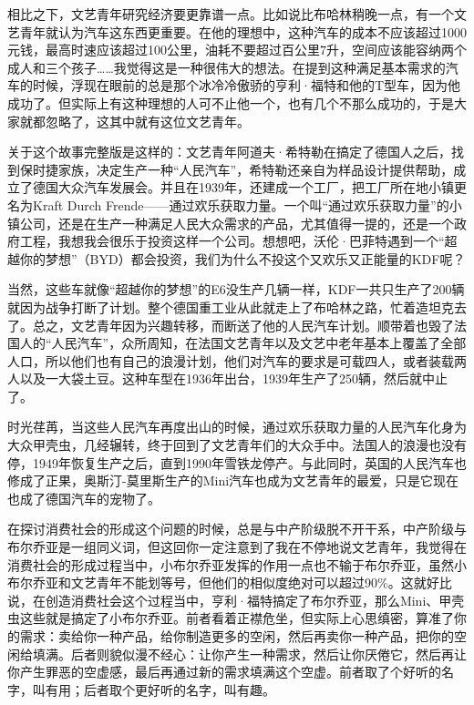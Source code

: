 相比之下，文艺青年研究经济要更靠谱一点。比如说比布哈林稍晚一点，有一个文艺青年就认为汽车这东西更重要。在他的理想中，这种汽车的成本不应该超过1000元钱，最高时速应该超过100公里，油耗不要超过百公里7升，空间应该能容纳两个成人和三个孩子\ldots{}\ldots{}我觉得这是一种很伟大的想法。在提到这种满足基本需求的汽车的时候，浮现在眼前的总是那个冰冷冷傲骄的亨利·福特和他的T型车，因为他成功了。但实际上有这种理想的人可不止他一个，也有几个不那么成功的，于是大家就都忽略了，这其中就有这位文艺青年。

关于这个故事完整版是这样的：文艺青年阿道夫·希特勒在搞定了德国人之后，找到保时捷家族，决定生产一种``人民汽车''，希特勒还亲自为样品设计提供帮助，成立了德国大众汽车发展会。并且在1939年，还建成一个工厂，把工厂所在地小镇更名为Kraft
Durch
Frende------通过欢乐获取力量。一个叫``通过欢乐获取力量''的小镇公司，还是在生产一种满足人民大众需求的产品，尤其值得一提的，还是一个政府工程，我想我会很乐于投资这样一个公司。想想吧，沃伦·巴菲特遇到一个``超越你的梦想''（BYD）都会投资，我们为什么不投这个又欢乐又正能量的KDF呢？

当然，这些车就像``超越你的梦想''的E6没生产几辆一样，KDF一共只生产了200辆就因为战争打断了计划。整个德国重工业从此就走上了布哈林之路，忙着造坦克去了。总之，文艺青年因为兴趣转移，而断送了他的人民汽车计划。顺带着也毁了法国人的``人民汽车''，众所周知，在法国文艺青年以及文艺中老年基本上覆盖了全部人口，所以他们也有自己的浪漫计划，他们对汽车的要求是可载四人，或者装载两人以及一大袋土豆。这种车型在1936年出台，1939年生产了250辆，然后就中止了。

时光荏苒，当这些人民汽车再度出山的时候，通过欢乐获取力量的人民汽车化身为大众甲壳虫，几经辗转，终于回到了文艺青年们的大众手中。法国人的浪漫也没有停，1949年恢复生产之后，直到1990年雪铁龙停产。与此同时，英国的人民汽车也修成了正果，奥斯汀-莫里斯生产的Mini汽车也成为文艺青年的最爱，只是它现在也成了德国汽车的宠物了。

在探讨消费社会的形成这个问题的时候，总是与中产阶级脱不开干系，中产阶级与布尔乔亚是一组同义词，但这回你一定注意到了我在不停地说文艺青年，我觉得在消费社会的形成过程当中，小布尔乔亚发挥的作用一点也不输于布尔乔亚，虽然小布尔乔亚和文艺青年不能划等号，但他们的相似度绝对可以超过90\%。这就好比说，在创造消费社会这个过程当中，亨利·福特搞定了布尔乔亚，那么Mini、甲壳虫这些就是搞定了小布尔乔亚。前者看着正襟危坐，但实际上心思缜密，算准了你的需求：卖给你一种产品，给你制造更多的空闲，然后再卖你一种产品，把你的空闲给填满。后者则貌似漫不经心：让你产生一种需求，然后让你厌倦它，然后再让你产生罪恶的空虚感，最后再通过新的需求填满这个空虚。前者取了个好听的名字，叫有用；后者取个更好听的名字，叫有趣。

